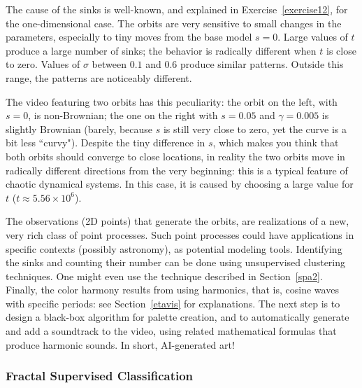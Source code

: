 \documentclass[10pt]{article}
\begin{document}
The cause of the sinks is well-known, and explained in Exercise~\ref{exercise12}, for the one-dimensional case. The orbits are very sensitive to small changes in the parameters, especially to
tiny moves from the base model $s=0$. Large values of $t$ produce a large number of sinks; the behavior is radically different when $t$ is close to zero. Values of $\sigma$ between $0.1$ and $0.6$ produce similar patterns. Outside this range, the patterns are noticeably different. 

The video featuring two orbits has this peculiarity: the orbit on the left, with $s=0$, is non-Brownian; the one on the right with $s=0.05$ and $\gamma=0.005$ is slightly Brownian (barely, because $s$ is still very close to zero, yet the curve is a bit less ``curvy"). Despite the tiny difference in $s$, which makes you think that both orbits should converge to close locations, in reality the two orbits move in radically different directions from the very beginning: this is a typical feature of chaotic \textcolor{index}{dynamical systems}. In this case, it is caused by choosing a large value for $t$ ($t\approx 5.56\times 10^6$).

The observations (2D points) that generate the orbits, are realizations of a new, very rich class of point processes.   
Such point processes could have applications in specific contexts (possibly astronomy), as potential modeling tools. Identifying the sinks and counting their number
can be done using \textcolor{index}{unsupervised clustering} techniques. One might even use the technique
described in Section~\ref{spa2}. Finally, the color harmony results from using harmonics, that is, cosine waves with specific periods: see 
Section~\ref{etavis} for explanations. The next step is to design a black-box algorithm for palette creation, and to automatically generate and add a soundtrack to the video, using related mathematical formulas that produce harmonic sounds. In short, AI-generated art!

\subsubsection{Fractal Supervised Classification}\label{videocluster2}
\end{document}
